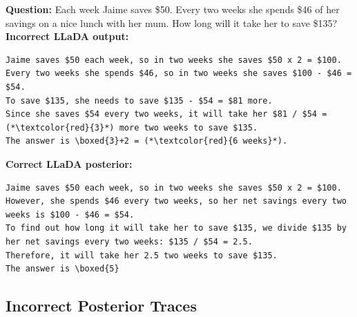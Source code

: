 \begin{examplebox}[Example 2]
\textbf{Question:} Each week Jaime saves \$50. Every two weeks she spends \$46 of her savings on a nice lunch with her mum. How long will it take her to save \$135? \\[6pt]

\textbf{Incorrect LLaDA output:}
\begin{lstlisting}
Jaime saves $50 each week, so in two weeks she saves $50 x 2 = $100.
Every two weeks she spends $46, so in two weeks she saves $100 - $46 = $54.
To save $135, she needs to save $135 - $54 = $81 more.
Since she saves $54 every two weeks, it will take her $81 / $54 = (*\textcolor{red}{3}*) more two weeks to save $135.
The answer is \boxed{3}+2 = (*\textcolor{red}{6 weeks}*).
\end{lstlisting}

\textbf{Correct LLaDA posterior:}
\begin{lstlisting}
Jaime saves $50 each week, so in two weeks she saves $50 x 2 = $100.
However, she spends $46 every two weeks, so her net savings every two weeks is $100 - $46 = $54.
To find out how long it will take her to save $135, we divide $135 by her net savings every two weeks: $135 / $54 = 2.5.
Therefore, it will take her 2.5 two weeks to save $135.
The answer is \boxed{5}
\end{lstlisting}
\end{examplebox}

\subsection{Incorrect Posterior Traces}

